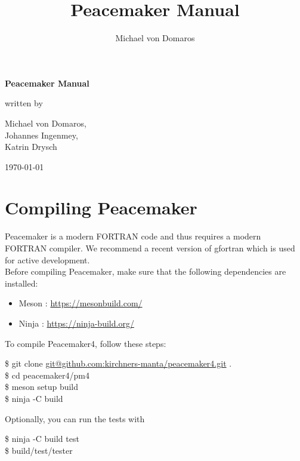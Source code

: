 \documentclass{scrartcl}
\begin{document}


\title{Peacemaker Manual}
\author{Michael von Domaros}
\begin{titlepage}
    \centering
    \Large

    \vspace*{5ex}
    \textbf{\Huge Peacemaker Manual}

    \vspace{\fill}
    written by
    
    \vspace{1ex}
    Michael von Domaros,\\
    Johannes Ingenmey,\\
    Katrin Drysch
    
    \vspace{2ex}
    \today
    \vspace{\fill}
\end{titlepage}

\tableofcontents
\pagebreak

\section{Compiling Peacemaker}

Peacemaker is a modern FORTRAN code and thus requires a modern FORTRAN compiler.
We recommend a recent version of gfortran which is used for active development. \\
Before compiling Peacemaker, make sure that the following dependencies are installed:
\begin{itemize}
    \item Meson : \url{https://mesonbuild.com/}
    \item Ninja : \url{https://ninja-build.org/}
\end{itemize}
To compile Peacemaker4, follow these steps:
\begin{addmargin}[1cm]{0cm}
    \ttfamily
    \$ git clone
    \url{git@github.com:kirchners-manta/peacemaker4.git} .\\
    \$ cd peacemaker4/pm4 \\
    \$ meson setup build \\
    \$ ninja -C build 
\end{addmargin}
Optionally, you can run the tests with
\begin{addmargin}[1cm]{0cm}
    \ttfamily
    \$ ninja -C build test \\
    \$ build/test/tester
\end{addmargin}
\end{document}
